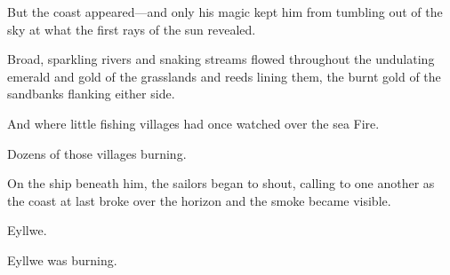 But the coast appeared---and only his magic kept him from tumbling out of the sky at what the first rays of the sun revealed.

Broad, sparkling rivers and snaking streams flowed throughout the undulating emerald and gold of the grasslands and reeds lining them, the burnt gold of the sandbanks flanking either side.

And where little fishing villages had once watched over the sea 
Fire.

Dozens of those villages burning.

On the ship beneath him, the sailors began to shout, calling to one another as the coast at last broke over the horizon and the smoke became visible.

Eyllwe.

Eyllwe was burning.
